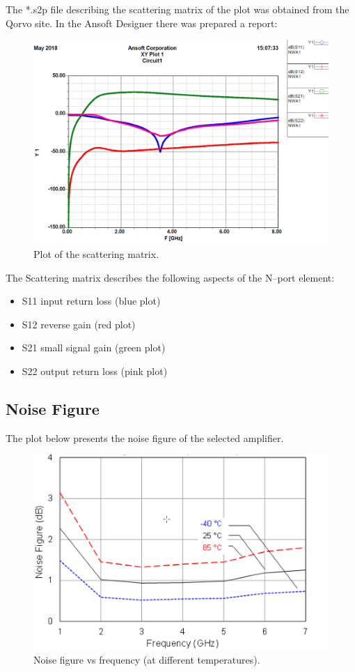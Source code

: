 \documentclass[eng,printmode]{mgr}
\begin{document}
\noindent
The *.s2p file describing the scattering matrix of the plot was obtained from the Qorvo site. In the Ansoft Designer there was prepared a report:
\begin{figure}[h]
	\centering
	\includegraphics[width=0.7\linewidth]{chip-plot}
	\caption{Plot of the scattering matrix.}
	\label{fig:chip-plot}
\end{figure}

The Scattering matrix describes the following aspects of the N--port element:
\begin{itemize}
\item S11 input return loss  (blue plot)
\item S12 reverse gain       (red plot)
\item S21 small signal gain  (green plot)
\item S22 output return loss (pink plot)
\end{itemize}

\subsection*{Noise Figure}
The plot below presents the noise figure of the selected amplifier.
\begin{figure}[h]
	\centering
	\includegraphics[width=0.6\linewidth]{noise}
	\caption{Noise figure vs frequency (at different temperatures).}
	\label{fig:noise}
\end{figure}
\end{document}
